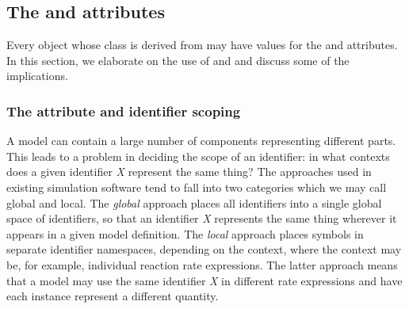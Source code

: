 \subsection{The  and  attributes }
\label{sec:idnameattribs}

{Every object whose class is derived from \SBase may have values for the  and  attributes.  In this section, we elaborate on the use of  and  and discuss some of the implications.}



\subsubsection{The  attribute and identifier scoping}
\label{sec:identifiers}

A model can contain a large number of components representing
different parts.  This leads to a problem in deciding the scope of
an identifier: in what contexts does a given identifier \emph{X}
represent the same thing?  The approaches used in existing
simulation software tend to fall into two categories which we may
call global and local.  The \emph{global} approach places all
identifiers into a single global space of identifiers, so that an
identifier \emph{X} represents the same thing wherever it appears
in a given model definition.  The \emph{local} approach places
symbols in separate identifier namespaces, depending on the
context, where the context may be, for example, individual
reaction rate expressions.  The latter approach means that a model
may use the same identifier \emph{X} in different rate expressions
and have each instance represent a different quantity.

